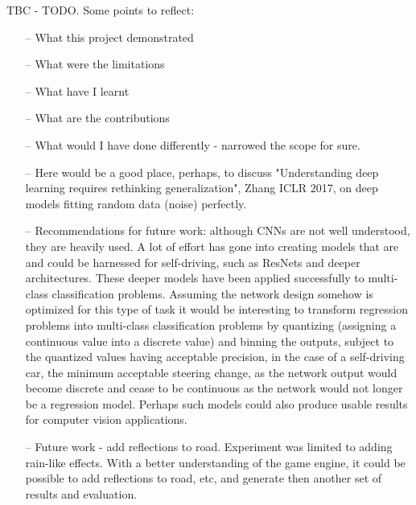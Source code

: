 TBC - TODO. Some points to reflect:
\begin{itemize}
    \item[--] What this project demonstrated
    \item[--] What were the limitations
    \item[--] What have I learnt
    \item[--] What are the contributions
    \item[--] What would I have done differently - narrowed the scope for sure.
    \item[--] Here would be a good place, perhaps, to discuss "Understanding deep learning requires rethinking generalization", Zhang ICLR 2017, on deep models fitting random data (noise) perfectly. 
    \item[--] Recommendations for future work: although CNNs are not well understood, they are heavily used. A lot of effort has gone into creating models that are and could be harnessed for self-driving, such as ResNets and deeper architectures. These deeper models have been applied successfully to multi-class classification problems. Assuming the network design somehow is optimized for this type of task it would be interesting to transform regression problems into multi-class classification problems by quantizing (assigning a continuous value into a discrete value) and binning the outputs, subject to the quantized values having acceptable precision, in the case of a self-driving car, the minimum acceptable steering change, as the network output would become discrete and cease to be continuous as the network would not longer be a regression model.
    Perhaps such models could also produce usable results for computer vision applications.
    \item[--] Future work - add reflections to road. Experiment was limited to adding rain-like effects. With a better understanding of the game engine, it could be possible to add reflections to road, etc, and generate then another set of results and evaluation.
\end{itemize}



